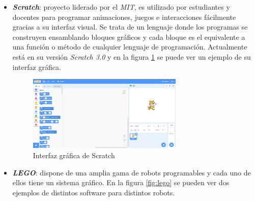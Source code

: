 \begin{itemize}
    \item \textit{\textbf{Scratch}}\cite{bib:scratch}: proyecto liderado por el \textit{MIT}, es utilizado por estudiantes y docentes para programar animaciones, juegos e interacciones fácilmente gracias a su interfaz visual. Se trata de un lenguaje donde los programas se construyen ensamblando bloques gráficos y cada bloque es el equivalente a una función o método de cualquier lenguaje de programación. Actualmente está en su versión \textit{Scratch 3.0} y en la figura \ref{fig:scratch} se puede ver un ejemplo de su interfaz gráfica.
    \begin{figure}[H]
    \centering
    \includegraphics[width=0.7\textwidth]{img/scratch.jpg}
    \caption{Interfaz gráfica de Scratch} \label{fig:scratch}
    \end{figure}

    \item \textit{\textbf{LEGO}}\cite{bib:lego}: dispone de una amplia gama de robots programables y cada uno de ellos tiene un sistema gráfico. En la figura \ref{fig:lego} se pueden ver dos ejemplos de distintos software para distintos robots.


\end{itemize}
